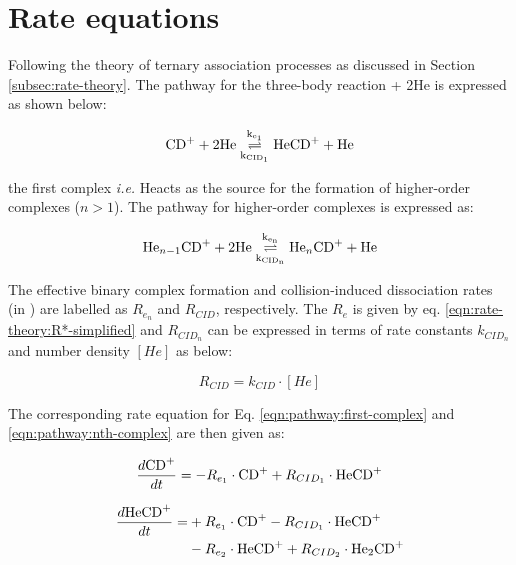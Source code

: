 \section{Rate equations}
\label{subsec:rate-equations}

Following the theory of ternary association processes as discussed in Section \ref{subsec:rate-theory}. The pathway for the three-body reaction \CD + 2He is expressed as shown below:

\begin{equation}
    \OverUnder[1]{\cd^+ + 2\he}{\he\cd^+ + \he}
    \label{eqn:pathway:first-complex}
\end{equation}

the first complex \emph{i.e.} He\CD acts as the source for the formation of higher-order complexes ($n > 1$).
The pathway for higher-order complexes is expressed as:

\begin{equation}
    \OverUnder[n]{\HenCD[n-1] + 2\he}{\HenCD[n] + \he}
    \label{eqn:pathway:nth-complex}
\end{equation}

The effective binary complex formation and collision-induced dissociation rates (in \pers) are labelled as $R_{e_n}$ and $R_{CID}$, respectively. The $R_{e}$ is given by eq. \ref{eqn:rate-theory:R*-simplified} and $R_{CID_n}$ can be expressed in terms of rate constants $k_{CID_n}$ and number density $[He]$ as below:

\begin{equation}
    R_{CID} = k_{CID} \cdot [He]
    \label{eqn:rate:rcid}
\end{equation}

The corresponding rate equation for Eq. \ref{eqn:pathway:first-complex} and \ref{eqn:pathway:nth-complex} are then given as:

\begin{equation}
    \frac{d\cd^+}{dt} = -R_{e_1} \cdot \cd^+ + R_{CID_1} \cdot \he\cd^+
    \label{eqn:rate:parent-ion}
\end{equation}

\begin{equation*}
    \begin{split}
        \frac{d\text{He}\text{CD}^+}{dt} = & +R_{e_1} \cdot \text{CD}^+ - R_{CID_1} \cdot \text{He}\text{CD}^+ \\
        & -R_{e_2} \cdot \text{He}\text{CD}^+ + R_{CID_2} \cdot \text{He}_2\text{CD}^+
    \end{split}
\end{equation*}

